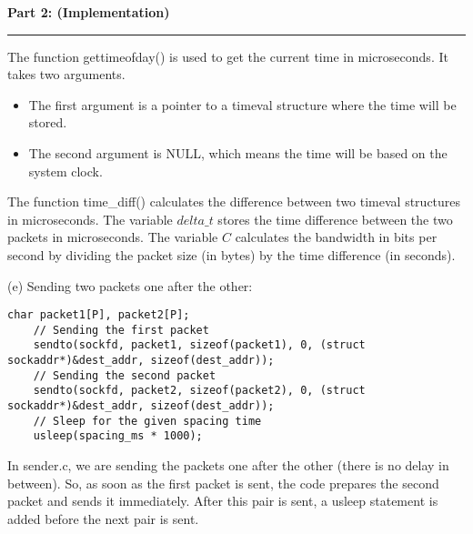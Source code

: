\documentclass[a4paper,12pt]{article}
\newenvironment{solution}[2][]{%
    \begin{mdframed}[linecolor=blue!70!black, linewidth=2pt, roundcorner=10pt, backgroundcolor=yellow!10!white, skipabove=12pt, skipbelow=12pt]%
        \textbf{\large #2}
        \par\noindent\rule{\textwidth}{0.4pt}
}{
    \end{mdframed}
}
\begin{document}
\begin{solution}{Part 2: (Implementation)}
The function gettimeofday() is used to get the current time in microseconds. It takes two arguments.
\begin{itemize}
    \item The first argument is a pointer to a timeval structure where the time will be stored.
    \item The second argument is NULL, which means the time will be based on the system clock.
\end{itemize}
The function time\_diff() calculates the difference between two timeval structures in microseconds. The variable $delta\_t$ stores the time difference between the two packets in microseconds. The variable $C$ calculates the bandwidth in bits per second by dividing the packet size (in bytes) by the time difference (in seconds).


(e) Sending two packets one after the other:
\begin{lstlisting}[caption=Sending two packets one after the other]
    char packet1[P], packet2[P];
    // Sending the first packet
    sendto(sockfd, packet1, sizeof(packet1), 0, (struct sockaddr*)&dest_addr, sizeof(dest_addr));
    // Sending the second packet
    sendto(sockfd, packet2, sizeof(packet2), 0, (struct sockaddr*)&dest_addr, sizeof(dest_addr));
    // Sleep for the given spacing time
    usleep(spacing_ms * 1000);
\end{lstlisting}

In sender.c, we are sending the packets one after the other (there is no delay in between). So, as soon as the first packet is sent, the code prepares the second packet and sends it immediately. After this pair is sent, a usleep statement is added before the next pair is sent. 



\end{solution}
\end{document}
